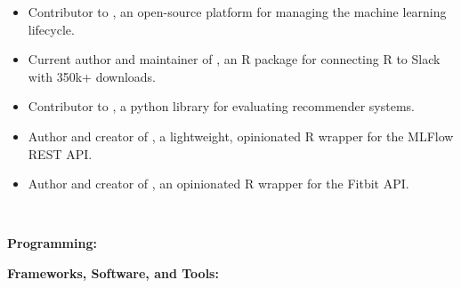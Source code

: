 \documentclass[10pt,a4paper,ragged2e,withhyper]{/Users/matt/documents/GitHub/mrkaye97.github.io/resume/altacv}
\newcommand{\MYhref}[3][red]{\href{#2}{\color{#1}{#3}}}%
\begin{document}
		\divider 
				

		\begin{itemize}
		\item Contributor to \MYhref{https://github.com/mlflow/mlflow}{MLFlow}, an open-source platform for managing the machine learning lifecycle.
		\item Current author and maintainer of \MYhref{https://github.com/mrkaye97/slackr}{slackr}, an R package for connecting R to Slack with 350k+ downloads.
		\item Contributor to \MYhref{https://github.com/statisticianinstilettos/recmetrics}{recmetrics}, a python library for evaluating recommender systems.
		\item Author and creator of \MYhref{https://github.com/collegevine/lightMLFlow}{lightMLFlow}, a lightweight, opinionated R wrapper for the MLFlow REST API.
		\item Author and creator of \MYhref{https://github.com/mrkaye97/fitbitr}{fitbitr}, an opinionated R wrapper for the Fitbit API.
		\end{itemize}

		\setcolumnwidth{4cm, 5cm,5cm} 
		\begin{paracol}{3}

		
		\divider\\


		\switchcolumn
		
		\textbf{Programming:}\\
		\medskip

		\smallskip
		\textbf{Frameworks, Software, and Tools:}\\
		\medskip

		 \\
		  \\
		 \\

		\switchcolumn
		
		
		\\
		\\
		\\
		\\
		\\
		\\
		
		\end{paracol}
\end{document}
